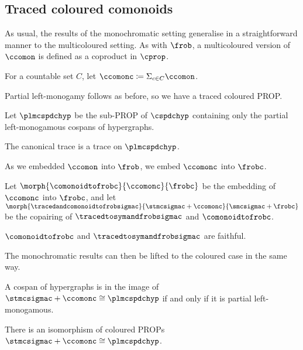 \subsection{Traced coloured comonoids}

As usual, the results of the monochromatic setting generalise in a
straightforward manner to the multicoloured setting.
As with \(\frob\), a multicoloured version of \(\ccomon\) is defined as a
coproduct in \(\cprop\).

\begin{definition}
    For a countable set \(C\), let
    \(\ccomonc \coloneqq \Sigma_{c \in C} \ccomon\).
\end{definition}

Partial left-monogamy follows as before, so we have a traced coloured PROP.

\begin{definition}
    Let \(\plmcspdchyp\) be the sub-PROP of \(\cspdchyp\) containing only the
    partial left-monogamous cospans of hypergraphs.
\end{definition}

\begin{proposition}
    The canonical trace is a trace on \(\plmcspdchyp\).
\end{proposition}

As we embedded \(\ccomon\) into \(\frob\), we embed \(\ccomonc\) into
\(\frobc\).

\begin{definition}
    Let \(
    \morph{
        \comonoidtofrobc
    }{
        \ccomonc
    }{
        \frobc
    }
    \) be the embedding of \(\ccomonc\) into \(\frobc\), and let \(
    \morph{
        \tracedandcomonoidtofrobsigmac
    }{
        \stmcsigmac + \ccomonc
    }{
        \smcsigmac + \frobc
    }
    \) be the copairing of \(\tracedtosymandfrobsigmac\) and
    \(\comonoidtofrobc\).
\end{definition}

\begin{corollary}
    \(\comonoidtofrobc\) and \(\tracedtosymandfrobsigmac\) are faithful.
\end{corollary}

The monochromatic results can then be lifted to the coloured case in the same
way.

\begin{theorem}\label{thm:comonoidc-fully-complete}
    A cospan of hypergraphs is in the image of
    \(\stmcsigmac + \ccomonc \cong \plmcspdchyp\) if and only if it is partial
    left-monogamous.
\end{theorem}

\begin{corollary}
    There is an isomorphism of coloured PROPs
    \(\stmcsigmac + \ccomonc \cong \plmcspdchyp\).
\end{corollary}